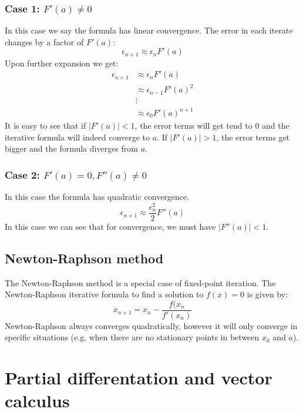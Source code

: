 \documentclass{scrartcl}
\begin{document}
\subsubsection*{Case 1: $ F'(a) \neq 0 $}

In this case we say the formula has linear convergence. The error in each iterate changes by a factor of $ F'(a) $:
\begin{equation}
\epsilon_{n+1} \approx \epsilon_{n} F'(a)
\end{equation}
Upon further expansion we get:
\begin{align}
\epsilon_{n+1} & \approx \epsilon_{n} F'(a) \\
& \approx \epsilon_{n-1} F'(a)^{2} \\
& \vdots \\
& \approx \epsilon_{0} F'(a)^{n+1}
\end{align}
It is easy to see that if $ |F'(a)| < 1 $, the error terms will get tend to $ 0 $ and the iterative formula will indeed converge to $ a $. If $ |F'(a)| > 1 $, the error terms get bigger and the formula diverges from $ a $.

\subsubsection*{Case 2: $ F'(a) = 0, F''(a) \neq 0 $}

In this case the formula has quadratic convergence.
\begin{equation}
\epsilon_{n+1} \approx \frac{\epsilon_{n}^{2}}{2} F''(a)
\end{equation}
In this case we can see that for convergence, we must have $ |F''(a)| < 1 $.

\subsection{Newton-Raphson method}

The Newton-Raphson method is a special case of fixed-point iteration. The Newton-Raphson iterative formula to find a solution to $ f(x) = 0 $ is given by:
\begin{equation}
x_{n+1} =x_{n} - \frac{f(x_{n}}{f'(x_{n})}
\end{equation}
Newton-Raphson always converges quadratically, however it will only converge in specific situations (e.g. when there are no stationary points in between $ x_{0} $ and $ a $).

\section{Partial differentation and vector calculus}
\end{document}
